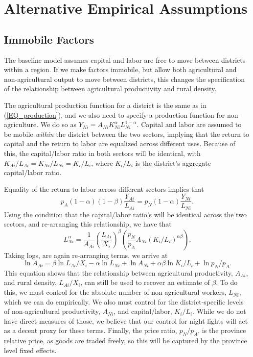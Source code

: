 \documentclass[11pt]{article}
\begin{document}
\section{Alternative Empirical Assumptions}

\subsection{Immobile Factors}
The baseline model assumes capital and labor are free to move between districts within a region. If we make factors immobile, but allow both agricultural and non-agricultural output to move between districts, this changes the specification of the relationship between agricultural productivity and rural density. 

The agricultural production function for a district is the same as in (\ref{EQ_production}), and we also need to specify a production function for non-agriculture. We do so as $Y_{Ni} = A_{Ni} K_{Ni}^{\alpha} L_{Ni}^{1-\alpha}$. Capital and labor are assumed to be mobile \textit{within} the district between the two sectors, implying that the return to capital and the return to labor are equalized across different uses. Because of this, the capital/labor ratio in both sectors will be identical, with $K_{Ai}/L_{Ai} = K_{Ni}/L_{Ni} = K_i/L_i$, where $K_i/L_i$ is the district's aggregate capital/labor ratio. 

Equality of the return to labor across different sectors implies that 
\begin{equation}
	p_A (1-\alpha)(1-\beta)\frac{Y_{Ai}}{L_{Ai}} = p_N (1-\alpha)\frac{Y_{Ni}}{L_{Ni}}. 
\end{equation}
Using the condition that the capital/labor ratio's will be identical across the two sectors, and re-arranging this relationship, we have that
\begin{equation}
	L_{Ni}^{\alpha} = \frac{1}{A_{Ai}}\left(\frac{L_{Ai}}{X_i}\right)^{\beta} \left(\frac{p_N}{p_A} A_{Ni}(K_i/L_i)^{\alpha\beta} \right).
\end{equation}
Taking logs, are again re-arranging terms, we arrive at
\begin{equation}
	\ln A_{Ai} = \beta \ln L_{Ai}/X_i - \alpha \ln L_{Ni} + \ln A_{Ni} + \alpha\beta \ln K_i/L_i + \ln p_N/p_A.
\end{equation}
This equation shows that the relationship between agricultural productivity, $A_{Ai}$, and rural density, $L_{Ai}/X_i$, can still be used to recover an estimate of $\beta$. To do this, we must control for the absolute number of non-agricultural workers, $L_{Ni}$, which we can do empirically. We also must control for the district-specific levels of non-agricultural productivity, $A_{Ni}$, and capital/labor, $K_i/L_i$. While we do not have direct measures of those, we believe that our control for night lights will act as a decent proxy for these terms. Finally, the price ratio, $p_N/p_A$, is the province relative price, as goods are traded freely, so this will be captured by the province level fixed effects.
\end{document}
